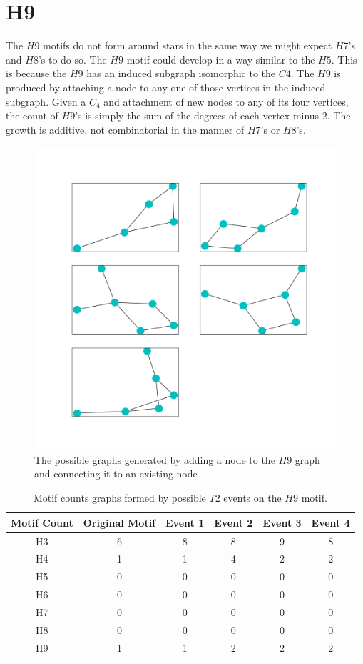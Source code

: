 \section{H9}
The $H9$ motifs do not form around stars in the same way we might expect $H7$'s and $H8$'s to do so.
 The $H9$ motif could develop in a way similar to the $H5$. This is because the $H9$ has an induced subgraph
 isomorphic to the $C4$. The $H9$ is produced by attaching a node to any one of those vertices in the induced
 subgraph. Given a $C_4$ and attachment
 of new nodes to any of its four vertices, the count of $H9$'s is simply the sum of the degrees of each
 vertex minus 2. The growth is additive, not combinatorial in the manner of $H7$'s or $H8$'s.

\begin{figure}[!ht]
    \includegraphics[width=12cm]{Images/H9_evolution.png}
    \centering
    \caption{The possible graphs generated by adding a node to the $H9$ graph 
    and connecting it to an existing node}
\end{figure}

\begin{table}
    \centering
    \begin{tabular}{||c c c c c c ||} 
    \hline
    Motif Count & Original Motif & Event 1 & Event 2 & Event 3  & Event 4\\ [0.5ex] 
    \hline\hline
    H3 & 6 & 8 & 8 & 9 & 8\\ 
    \hline
    H4 & 1 & 1 & 4 & 2 & 2 \\
    \hline
    H5 & 0 & 0 & 0 & 0 & 0\\
    \hline
    H6 & 0 & 0 & 0 & 0 & 0\\
    \hline
    H7 & 0 & 0 & 0 & 0 & 0\\
    \hline
    H8 & 0 & 0 & 0 & 0& 0\\
    \hline
    H9 & 1 & 1 & 2 & 2 &2\\
    \hline
   \end{tabular}
   \caption{Motif counts graphs formed by possible $T2$ events on the $H9$ motif.}
   \label{table:7}
\end{table}

